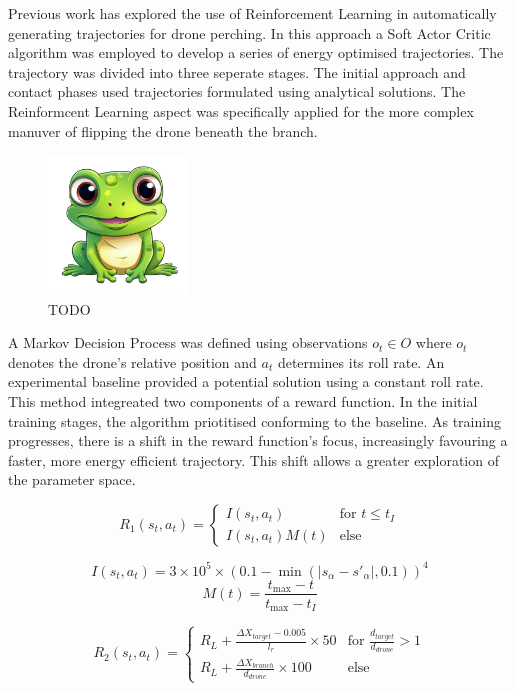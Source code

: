 Previous work has explored the use of Reinforcement Learning in automatically generating trajectories for drone perching\cite{learnedTetheredPerchingFabian}.
In this approach a Soft Actor Critic algorithm was employed to develop a series of energy optimised trajectories.
The trajectory was divided into three seperate stages.
The initial approach and contact phases used trajectories formulated using analytical solutions.
The Reinformcent Learning aspect was specifically applied for the more complex manuver of flipping the drone beneath the branch.

\begin{figure}[htbp]
  \centering
  \includegraphics[width=0.33\textwidth]{frog.png}
  \caption{TODO}
\label{fig:previous-work-manuever-diagram}
\end{figure}

A Markov Decision Process was defined using observations $o_{t} \in O$ where $o_{t}$ denotes the drone's relative position and $a_{t}$ determines its roll rate.
An experimental baseline provided a potential solution using a constant roll rate.
This method integreated two components of a reward function.
In the initial training stages, the algorithm priotitised conforming to the baseline.
As training progresses, there is a shift in the reward function's focus, increasingly favouring a faster, more energy efficient trajectory.
This shift allows a greater exploration of the parameter space.

\[
R_{1}(s_{t}, a_{t}) = 
\begin{cases} 
I(s_{t}, a_{t}) & \text{for } t \leq t_{I} \\
I(s_{t}, a_{t}) M(t) & \text{else} 
\end{cases}
\]

\[I(s_{t}, a_{t}) = 3 \times 10 ^ 5 \times (0.1 - \min(|s_{\alpha} - s'_{\alpha}|, 0.1)) ^ 4\]
\[M(t) = \frac{t_{\max} - t}{t_{\max} - t_{I}}\]

\[
R_{2}(s_{t}, a_{t}) =
\begin{cases}
  R_{L} + \frac{\Delta X_{target} - 0.005}{l_{r}} \times 50 & \text{for } \frac{d_{target}}{d_{drone}} > 1 \\
  R_{L} + \frac{\Delta X_{branch}}{d_{drone}} \times 100 & \text{else}
\end{cases}
\]

